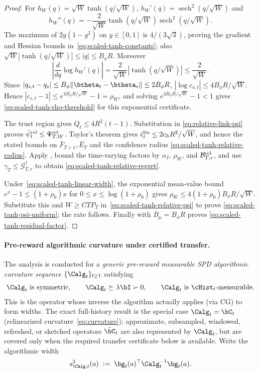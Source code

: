 \begin{proof}
For $h_W(q)=\sqrt W\tanh(q/\sqrt W)$,
$h_W'(q)=\operatorname{sech}^2(q/\sqrt W)$ and
\[
 h_W''(q)=-\frac{2}{\sqrt W}\tanh(q/\sqrt W)
 \operatorname{sech}^2(q/\sqrt W).
\]
The maximum of $2y(1-y^2)$ on $y\in[0,1]$ is $4/(3\sqrt3)$, proving the
gradient and Hessian bounds in~\eqref{eq:scaled-tanh-constants}; also
$\sqrt W|\tanh(q/\sqrt W)|\le|q|\le B_\phi R$.
Moreover
\[
 \left|\frac{d}{dq}\log h_W'(q)\right|
 =\frac{2}{\sqrt W}|\tanh(q/\sqrt W)|\le\frac2{\sqrt W}.
\]
Since $|q_{s,t}-q_s|\le B_\phi\|\btheta_t-\btheta_s\|\le2B_\phi R$,
$|\log c_{s,t}|\le4B_\phi R/\sqrt W$.  Hence
$|c_{s,t}-1|\le e^{4B_\phi R/\sqrt W}-1=\rho_W$, and solving
$e^{4B_\phi R/\sqrt W}-1<1$ gives
\eqref{eq:scaled-tanh-rho-threshold} for this exponential certificate.

The trust region gives $Q_t\le4R^2(t-1)$.  Substitution in
\eqref{eq:relative-link-psi} proves
$\bar\psi_t^{\rm rel}\le\Psi^{\rm rel}_{T,W}$.  Taylor's theorem gives
$\bar\epsilon_t^{\rm lin}\le2c_hR^2/\sqrt W$, and hence the stated bounds on
$\bar F_{T+1},\bar E_T$ and the confidence radius
\eqref{eq:scaled-tanh-relative-radius}.  Apply
, bound the time-varying factors by
$\alpha_I$, $\rho_W$, and $\mathcal B^{\rm rel}_{T,r}$, and use
$\gamma_T\le\mathcal G^\uparrow_{T,r}$ to obtain
\eqref{eq:scaled-tanh-relative-regret}.

Under~\eqref{eq:scaled-tanh-linear-width}, the exponential mean-value bound
$e^x-1\le(1+\rho_0)x$ for $0\le x\le\log(1+\rho_0)$ gives
$\rho_W\le4(1+\rho_0)B_\phi R/\sqrt W$.  Substitute this and
$W\ge CTP_T$ in~\eqref{eq:scaled-tanh-relative-psi} to prove
\eqref{eq:scaled-tanh-psi-uniform}; the rate follows.  Finally
 with $B_\mu=B_\phi R$ proves
\eqref{eq:scaled-tanh-residual-factor}.
\end{proof}

\paragraph{Pre-reward algorithmic curvature under certified transfer.}
The analysis is conducted for a \emph{generic pre-reward measurable SPD algorithmic
curvature sequence} $\{\Calg_t\}_{t\ge1}$ satisfying
\begin{equation}\label{eq:calg-props}
  \Calg_t\ \text{is symmetric},\qquad
  \Calg_t\succeq\lambda\bI\succ 0,\qquad
  \Calg_t\ \text{is}\ \cHist_t\text{-measurable}.
\end{equation}
This is the operator whose inverse the algorithm actually applies (via CG)
to form widths.  The exact full-history result is the special case
$\Calg_t=\bC_t$ (relinearized curvature~\eqref{eq:curvature}); approximate,
subsampled, windowed, refreshed, or sketched operators $\hat\bC_t$ are also
represented by $\Calg_t$, but are covered only when the required transfer
certificate below is available.  Write the algorithmic width
\begin{equation}\label{eq:scalg-def}
  s_{\Calg,t}^2(a)\;:=\;\bg_t(a)^\top\Calg_t^{-1}\bg_t(a).
\end{equation}

